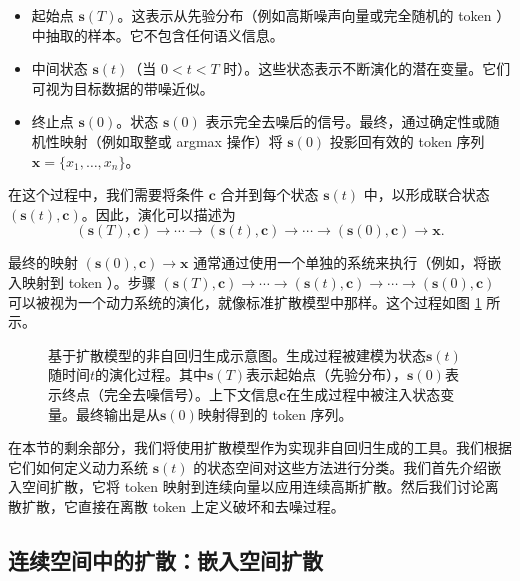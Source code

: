 \begin{itemize}
\item 起始点 $\mathbf{s}(T)$。这表示从先验分布（例如高斯噪声向量或完全随机的 token ）中抽取的样本。它不包含任何语义信息。
\item 中间状态 $\mathbf{s}(t)$（当 $0 < t < T$ 时）。这些状态表示不断演化的潜在变量。它们可视为目标数据的带噪近似。
\item 终止点 $\mathbf{s}(0)$。状态 $\mathbf{s}(0)$ 表示完全去噪后的信号。最终，通过确定性或随机性映射（例如取整或 argmax 操作）将 $\mathbf{s}(0)$ 投影回有效的 token 序列 $\mathbf{x} = \{x_1, \dots, x_n\}$。
\end{itemize}

在这个过程中，我们需要将条件 $\mathbf{c}$ 合并到每个状态 $\mathbf{s}(t)$ 中，以形成联合状态 $(\mathbf{s}(t), \mathbf{c})$。因此，演化可以描述为
\begin{equation}
(\mathbf{s}(T), \mathbf{c}) \to \cdots \to (\mathbf{s}(t), \mathbf{c}) \to \cdots \to (\mathbf{s}(0), \mathbf{c}) \to \mathbf{x}.
\end{equation}

最终的映射 $(\mathbf{s}(0), \mathbf{c}) \to \mathbf{x}$ 通常通过使用一个单独的系统来执行（例如，将嵌入映射到 token ）。步骤 $(\mathbf{s}(T), \mathbf{c}) \to \cdots \to (\mathbf{s}(t), \mathbf{c}) \to \cdots \to (\mathbf{s}(0), \mathbf{c})$ 可以被视为一个动力系统的演化，就像标准扩散模型中那样。这个过程如图 \ref{fig:diffiusion-modeling-as-nar-generation} 所示。

\begin{figure}[!t]
\centering
{}
\caption{基于扩散模型的非自回归生成示意图。生成过程被建模为状态$\mathbf{s}(t)$随时间$t$的演化过程。其中$\mathbf{s}(T)$表示起始点（先验分布），$\mathbf{s}(0)$表示终点（完全去噪信号）。上下文信息$\mathbf{c}$在生成过程中被注入状态变量。最终输出是从$\mathbf{s}(0)$映射得到的 token 序列。}
\label{fig:diffiusion-modeling-as-nar-generation}
\end{figure}

在本节的剩余部分，我们将使用扩散模型作为实现非自回归生成的工具。我们根据它们如何定义动力系统 $\mathbf{s}(t)$ 的状态空间对这些方法进行分类。我们首先介绍嵌入空间扩散，它将 token 映射到连续向量以应用连续高斯扩散。然后我们讨论离散扩散，它直接在离散 token 上定义破坏和去噪过程。
\subsection{连续空间中的扩散：嵌入空间扩散}

